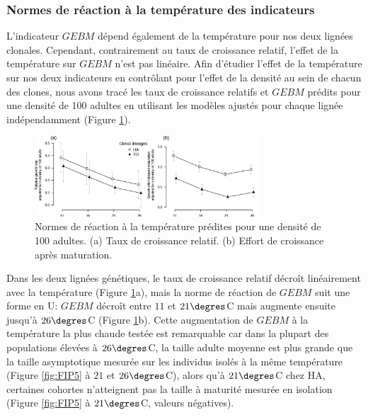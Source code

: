 \subsubsection{Normes de réaction à la température des indicateurs}

L'indicateur $GEBM$ dépend également de la température pour nos deux lignées
clonales. Cependant, contrairement au taux de croissance relatif, l'effet de la
température sur $GEBM$ n'est pas linéaire. Afin d'étudier l'effet de la
température sur nos deux indicateurs en contrôlant pour l'effet de la densité au
sein de chacun des clones, nous avons tracé les taux de croissance relatifs et
$GEBM$ prédits pour une densité de 100 adultes en utilisant les modèles ajustés
pour chaque lignée indépendamment (Figure \ref{fig:FIP7a}). 

\begin{figure}[!ht]
\begin{center}
\includegraphics[width=0.75\textwidth]{1_CorpsDeThese/Resumes/Fig/FIP07a}
\caption[Normes de réaction
prédites à la température]{Normes de réaction à la température prédites pour
une densité de 100 adultes. (a) Taux de croissance relatif. (b) Effort de
croissance après maturation.}
\label{fig:FIP7a}
\end{center}
\end{figure}

Dans les deux lignées génétiques, le taux de croissance relatif décroît
linéairement avec la température (Figure \ref{fig:FIP7a}a), mais la norme de
réaction de $GEBM$ suit une forme en U: $GEBM$ décroît entre $11$ et
$21\degres$C mais augmente ensuite jusqu'à $26\degres$C (Figure
\ref{fig:FIP7a}b). Cette augmentation de $GEBM$ à la température la plus chaude
testée est remarquable car dans la plupart des populations élevées à $26\degres$C, la
taille adulte moyenne est plus grande que la taille asymptotique mesurée sur les
individus isolés à la même température (Figure \ref{fig:FIP5} à $21$ et
$26\degres$C), alors qu'à $21\degres$C chez HA, certaines cohortes n'atteignent
pas la taille à maturité mesurée en isolation (Figure \ref{fig:FIP5} à
$21\degres$C, valeurs négatives).


